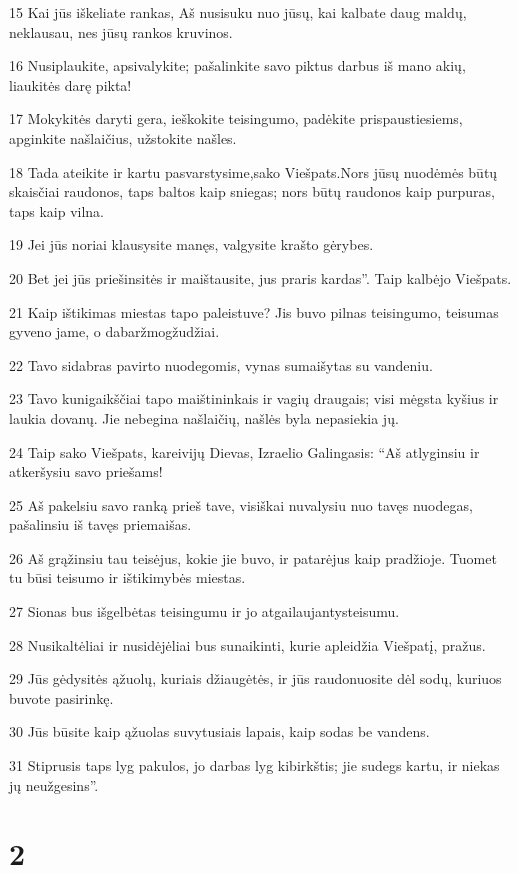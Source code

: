 \par 15 Kai jūs iškeliate rankas, Aš nusisuku nuo jūsų, kai kalbate daug maldų, neklausau, nes jūsų rankos kruvinos. 
\par 16 Nusiplaukite, apsivalykite; pašalinkite savo piktus darbus iš mano akių, liaukitės darę pikta! 
\par 17 Mokykitės daryti gera, ieškokite teisingumo, padėkite prispaustiesiems, apginkite našlaičius, užstokite našles. 
\par 18 Tada ateikite ir kartu pasvarstysime,­sako Viešpats.­Nors jūsų nuodėmės būtų skaisčiai raudonos, taps baltos kaip sniegas; nors būtų raudonos kaip purpuras, taps kaip vilna. 
\par 19 Jei jūs noriai klausysite manęs, valgysite krašto gėrybes. 
\par 20 Bet jei jūs priešinsitės ir maištausite, jus praris kardas”. Taip kalbėjo Viešpats. 
\par 21 Kaip ištikimas miestas tapo paleistuve? Jis buvo pilnas teisingumo, teisumas gyveno jame, o dabar­žmogžudžiai. 
\par 22 Tavo sidabras pavirto nuodegomis, vynas sumaišytas su vandeniu. 
\par 23 Tavo kunigaikščiai tapo maištininkais ir vagių draugais; visi mėgsta kyšius ir laukia dovanų. Jie nebegina našlaičių, našlės byla nepasiekia jų. 
\par 24 Taip sako Viešpats, kareivijų Dievas, Izraelio Galingasis: “Aš atlyginsiu ir atkeršysiu savo priešams! 
\par 25 Aš pakelsiu savo ranką prieš tave, visiškai nuvalysiu nuo tavęs nuodegas, pašalinsiu iš tavęs priemaišas. 
\par 26 Aš grąžinsiu tau teisėjus, kokie jie buvo, ir patarėjus kaip pradžioje. Tuomet tu būsi teisumo ir ištikimybės miestas. 
\par 27 Sionas bus išgelbėtas teisingumu ir jo atgailaujantys­teisumu. 
\par 28 Nusikaltėliai ir nusidėjėliai bus sunaikinti, kurie apleidžia Viešpatį, pražus. 
\par 29 Jūs gėdysitės ąžuolų, kuriais džiaugėtės, ir jūs raudonuosite dėl sodų, kuriuos buvote pasirinkę. 
\par 30 Jūs būsite kaip ąžuolas suvytusiais lapais, kaip sodas be vandens. 
\par 31 Stiprusis taps lyg pakulos, jo darbas lyg kibirkštis; jie sudegs kartu, ir niekas jų neužgesins”.


\chapter{2}


